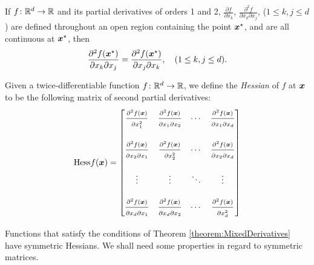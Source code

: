 \begin{theorem}[Clairaut]\label{theorem:MixedDerivatives}
If $f\colon \mathbb{R}^d \to \mathbb{R}$ and its partial derivatives of orders 1 and 2, $\frac{\partial f}{\partial x_k}$, $\frac{\partial^2 f}{\partial x_k \partial x_j}$, ($1\leq k,j \leq d$) are defined throughout an open region containing the point $\boldsymbol{x}^{\star}$, and are all continuous at $\boldsymbol{x}^{\star}$, then 
\begin{equation*}
\frac{\partial^2 f(\boldsymbol{x}^{\star})}{\partial x_k \partial x_j} = \frac{\partial^2 f(\boldsymbol{x}^{\star})}{\partial x_j \partial x_k}, \quad (1\leq k,j \leq d). 
\end{equation*}
\end{theorem}

\begin{definition}[Hessian]\label{def:Hessian}
Given a twice-differentiable function $f\colon \mathbb{R}^d \to \mathbb{R}$, we define the \emph{Hessian} of $f$ at $\boldsymbol{x}$ to be the following matrix of second partial derivatives:
\begin{equation*}
\mathop{\mathrm{Hess}{f}}(\boldsymbol{x}) = \begin{bmatrix}
\frac{\strut\partial^2 f (\boldsymbol{x})}{\strut\partial x_1^2} & \frac{\strut\partial^2 f (\boldsymbol{x})}{\strut\partial x_1 \partial x_2} &\dotsb &\frac{\strut\partial^2 f (\boldsymbol{x})}{\strut\partial x_1 \partial x_d} \\
&&&\\
\frac{\strut\partial^2 f (\boldsymbol{x})}{\strut\partial x_2 \partial x_1} & \frac{\strut\partial^2 f (\boldsymbol{x})}{\strut\partial x_2^2} &\dotsb &\frac{\strut\partial^2 f (\boldsymbol{x})}{\strut\partial x_2 \partial x_d} \\
&&& \\
\vdots & \vdots &\ddots &\vdots \\
&&& \\
\frac{\strut\partial^2 f (\boldsymbol{x})}{\strut\partial x_d \partial x_1} & \frac{\strut\partial^2 f (\boldsymbol{x})}{\strut\partial x_d \partial x_2} &\dotsb &\frac{\strut\partial^2 f (\boldsymbol{x})}{\strut\partial x_d^2}
\end{bmatrix}
\end{equation*}
\end{definition}

\separator

Functions that satisfy the conditions of Theorem \ref{theorem:MixedDerivatives} have symmetric Hessians.  We shall need some properties in regard to symmetric matrices.

